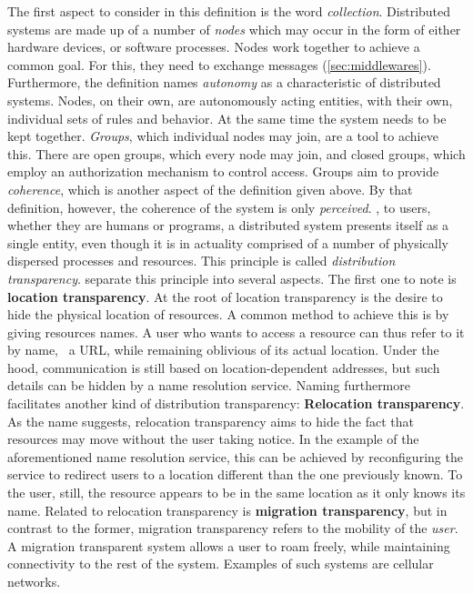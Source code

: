 The first aspect to consider in this definition is the word \emph{collection}. Distributed systems are made up of a number of \emph{nodes} which may occur in the form of either hardware devices, or software processes. Nodes work together to achieve a common goal. For this, they need to exchange messages (\cf \autoref{sec:middlewares}). Furthermore, the definition names \emph{autonomy} as a characteristic of distributed systems. Nodes, on their own, are autonomously acting entities, with their own, individual sets of rules and behavior. At the same time the system needs to be kept together. \emph{Groups}, which individual nodes may join, are a tool to achieve this. There are open groups, which every node may join, and closed groups, which employ an authorization mechanism to control access. 
Groups aim to provide \emph{coherence}, which is another aspect of the definition given above. By that definition, however, the coherence of the system is only \emph{perceived}. \Ie , to users, whether they are humans or programs, a distributed system presents itself as a single entity, even though it is in actuality comprised of a number of physically dispersed processes and resources. This principle is called \emph{distribution transparency}. \citeauthor*{tanenbaum2017distributed} \cite{tanenbaum2017distributed} separate this principle into several aspects. The first one to note is \textbf{location transparency}. At the root of location transparency is the desire to hide the physical location of resources. A common method to achieve this is by giving resources names. A user who wants to access a resource can thus refer to it by name, \eg\ a URL, while remaining oblivious of its actual location. Under the hood, communication is still based on location-dependent addresses, but such details can be hidden by a name resolution service. Naming furthermore facilitates another kind of distribution transparency: \textbf{Relocation transparency}. As the name suggests, relocation transparency aims to hide the fact that resources may move without the user taking notice. In the example of the aforementioned name resolution service, this can be achieved by reconfiguring the service to redirect users to a location different than the one previously known. To the user, still, the resource appears to be in the same location as it only knows its name. Related to relocation transparency is \textbf{migration transparency}, but in contrast to the former, migration transparency refers to the mobility of the \emph{user}. A migration transparent system allows a user to roam freely, while maintaining connectivity to the rest of the system. Examples of such systems are cellular networks.

